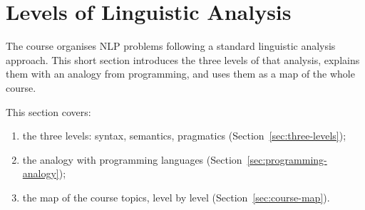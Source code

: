 \section{Levels of Linguistic Analysis}
\label{sec:linguistic-analysis}

The course organises NLP problems following a standard linguistic analysis approach.
This short section introduces the three levels of that analysis, explains them with an
analogy from programming, and uses them as a map of the whole course.

This section covers:
\begin{enumerate}[nosep]
  \item the three levels: syntax, semantics, pragmatics (Section~\ref{sec:three-levels});
  \item the analogy with programming languages (Section~\ref{sec:programming-analogy});
  \item the map of the course topics, level by level (Section~\ref{sec:course-map}).
\end{enumerate}




